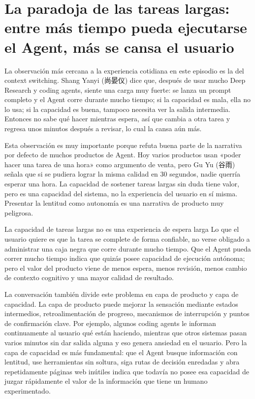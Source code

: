 \section{La paradoja de las tareas largas: entre más tiempo pueda ejecutarse el Agent, más se cansa el usuario}

La observación más cercana a la experiencia cotidiana en este episodio es la del context switching. Shang Yanyi (尚晏仪) dice que, después de usar mucho Deep Research y coding agents, siente una carga muy fuerte: se lanza un prompt completo y el Agent corre durante mucho tiempo; si la capacidad es mala, ella no lo usa; si la capacidad es buena, tampoco necesita ver la salida intermedia. Entonces no sabe qué hacer mientras espera, así que cambia a otra tarea y regresa unos minutos después a revisar, lo cual la cansa aún más.

Esta observación es muy importante porque refuta buena parte de la narrativa por defecto de muchos productos de Agent. Hoy varios productos usan «poder hacer una tarea de una hora» como argumento de venta, pero Gu Yu (谷雨) señala que si se pudiera lograr la misma calidad en 30 segundos, nadie querría esperar una hora. La capacidad de sostener tareas largas sin duda tiene valor, pero es una capacidad del sistema, no la experiencia del usuario en sí misma. Presentar la lentitud como autonomía es una narrativa de producto muy peligrosa.

\begin{importantbox}{La capacidad de tareas largas no es una experiencia de espera larga}
Lo que el usuario quiere es que la tarea se complete de forma confiable, no verse obligado a administrar una caja negra que corre durante mucho tiempo. Que el Agent pueda correr mucho tiempo indica que quizás posee capacidad de ejecución autónoma; pero el valor del producto viene de menos espera, menos revisión, menos cambio de contexto cognitivo y una mayor calidad de resultado.
\end{importantbox}

La conversación también divide este problema en capa de producto y capa de capacidad. La capa de producto puede mejorar la sensación mediante estados intermedios, retroalimentación de progreso, mecanismos de interrupción y puntos de confirmación clave. Por ejemplo, algunos coding agents le informan continuamente al usuario qué están haciendo, mientras que otros sistemas pasan varios minutos sin dar salida alguna y eso genera ansiedad en el usuario. Pero la capa de capacidad es más fundamental: que el Agent busque información con lentitud, use herramientas sin soltura, siga rutas de decisión enredadas y abra repetidamente páginas web inútiles indica que todavía no posee esa capacidad de juzgar rápidamente el valor de la información que tiene un humano experimentado.


